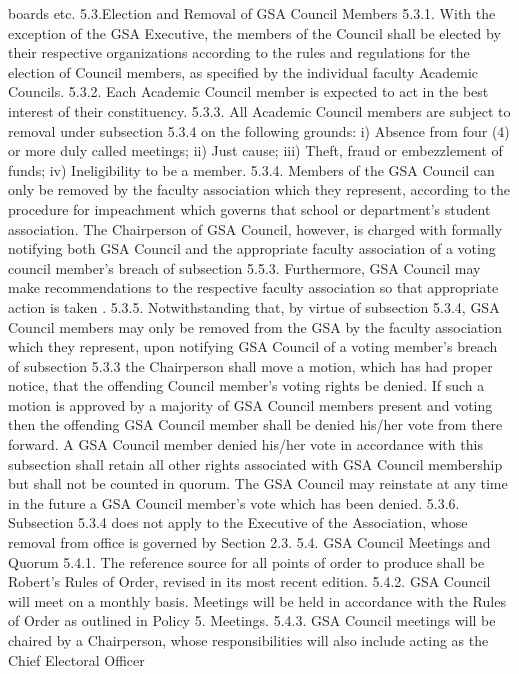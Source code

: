 \documentclass{article}
\begin{document}
boards etc.
5.3.Election and Removal of GSA Council Members 
5.3.1. With the exception of the GSA Executive, the members of the Council 
shall be elected by their respective organizations according to the rules 
and regulations for the election of Council members, as specified by 
the individual faculty Academic Councils. 
5.3.2. Each Academic Council member is expected to act in the best interest 
of their constituency. 
5.3.3. All Academic Council members are subject to removal under 
subsection 5.3.4 on the following grounds: 
i) Absence from four (4) or more duly called meetings; 
ii) Just cause; 
iii) Theft, fraud or embezzlement of funds; 
iv) Ineligibility to be a member. 
5.3.4. Members of the GSA Council can only be removed by the faculty 
association which they represent, according to the procedure for 
impeachment which governs that school or department’s student 
association. The Chairperson of GSA Council, however, is charged 
with formally notifying both GSA Council and the appropriate faculty 
association of a voting council member's breach of subsection 5.5.3. 
Furthermore, GSA Council may make recommendations to the 
respective faculty association so that appropriate action is taken . 
5.3.5. Notwithstanding that, by virtue of subsection 5.3.4, GSA Council 
members may only be removed from the GSA by the faculty 
association which they represent, upon notifying GSA Council of a 
voting member's breach of subsection 5.3.3 the Chairperson shall 
move a motion, which has had proper notice, that the offending 
Council member's voting rights be denied. If such a motion is 
approved by a majority of GSA Council members present and voting 
then the offending GSA Council member shall be denied his/her vote 
from there forward. A GSA Council member denied his/her vote in 
accordance with this subsection shall retain all other rights associated 
with GSA Council membership but shall not be counted in quorum. 
The GSA Council may reinstate at any time in the future a GSA 
Council member's vote which has been denied. 
5.3.6. Subsection 5.3.4 does not apply to the Executive of the Association, 
whose removal from office is governed by Section 2.3. 
5.4. GSA Council Meetings and Quorum 
5.4.1. The reference source for all points of order to produce shall be 
Robert’s Rules of Order, revised in its most recent edition. 
5.4.2. GSA Council will meet on a monthly basis. Meetings will be held in 
accordance with the Rules of Order as outlined in Policy 5. Meetings. 
5.4.3. GSA Council meetings will be chaired by a Chairperson, whose 
responsibilities will also include acting as the Chief Electoral Officer 
\end{document}
